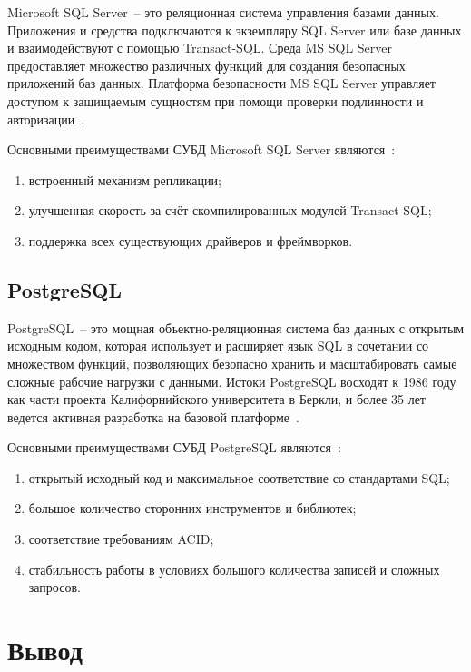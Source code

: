 Microsoft SQL Server~-- это реляционная система управления базами данных.
Приложения и средства подключаются к экземпляру SQL Server или базе данных и взаимодействуют с помощью Transact-SQL.
Среда MS SQL Server предоставляет множество различных функций для создания безопасных приложений баз данных. 
Платформа безопасности MS SQL Server управляет доступом к защищаемым сущностям при помощи проверки подлинности и авторизации~\cite{mssql, allDBs}.

Основными преимуществами СУБД Microsoft SQL Server являются~\cite{cmpSCDB5}:
\begin{enumerate}
	\item встроенный механизм репликации;
	\item улучшенная скорость за счёт скомпилированных модулей Transact-SQL;
	\item поддержка всех существующих драйверов и фреймворков.
\end{enumerate}

\subsection{PostgreSQL}

PostgreSQL~-- это мощная объектно-реляционная система баз данных с открытым исходным кодом, которая использует и расширяет язык SQL в сочетании со множеством функций, позволяющих безопасно хранить и масштабировать самые сложные рабочие нагрузки с данными.
Истоки PostgreSQL восходят к 1986 году как части проекта Калифорнийского университета в Беркли, и более 35 лет ведется активная разработка на базовой платформе~\cite{postgresql}.

Основными преимуществами СУБД PostgreSQL являются~\cite{cmpSCDB1, cmpSCDB2, cmpSCDB3}:
\begin{enumerate}
	\item открытый исходный код и максимальное соответствие со стандартами SQL;
	\item большое количество сторонних инструментов и библиотек;
	\item соответствие требованиям ACID;
	\item стабильность работы в условиях большого количества записей и сложных запросов.
\end{enumerate}

\section*{Вывод}

